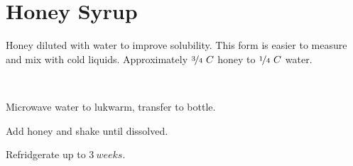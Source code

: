 \section{Honey Syrup}


\begin{recipestats}[
	servings=$\approx~1~Cup$,
	preptime=5~\minute,
	source=Mike \& Jane,
	original=\citefield{cocktailSeminars2021}{title} \cite{cocktailSeminars2021},
]
\end{recipestats}

\begin{recipeabstract}
	Honey diluted with water to improve solubility.
	This form is easier to measure and mix with cold liquids.
	Approximately $\nicefrac{3}{4}~C$ honey to $\nicefrac{1}{4}~C$ water.
\end{recipeabstract}

\begin{ingredientcolumns}[1]
	\begin{ingredientblock}
		\\
	\end{ingredientblock}
\end{ingredientcolumns}


\begin{preparation}
\item Microwave water to lukwarm, transfer to bottle.
\item Add honey and shake until dissolved.
\item Refridgerate up to $3~weeks$.
\end{preparation}


\recipeend
